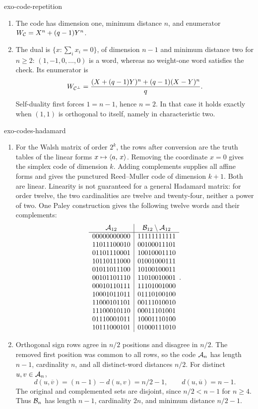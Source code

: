 \begin{correction}{exo-code-repetition}
\begin{enumerate}
\item The code has dimension one, minimum distance $n$, and enumerator
$W_{\mathcal{C}}=X^n+(q-1)Y^n$.
\item The dual is $\{x:\sum_i x_i=0\}$, of dimension $n-1$ and
minimum distance two for $n\geq2$: $(1,-1,0,\ldots,0)$ is a word,
whereas no weight-one word satisfies the check. Its enumerator is
\[
 W_{\mathcal{C}^\bot}=\frac{(X+(q-1)Y)^n+(q-1)(X-Y)^n}{q}.
\]
Self-duality first forces $1=n-1$, hence $n=2$. In that case it holds
exactly when $(1,1)$ is orthogonal to itself, namely in characteristic two.
\end{enumerate}
\end{correction}

\begin{correction}{exo-codes-hadamard}
\begin{enumerate}
\item For the Walsh matrix of order $2^k$, the rows after conversion
are the truth tables of the linear forms $x\mapsto\langle a,\,x\rangle$.
Removing the coordinate $x=0$ gives the simplex code of dimension $k$.
Adding complements supplies all affine forms and gives the punctured
Reed--Muller code of dimension $k+1$. Both are linear. Linearity is not
guaranteed for a general Hadamard matrix: for order twelve, the two
cardinalities are twelve and twenty-four, neither a power of two.
One Paley construction gives the following twelve words and their
complements:
\[
\begin{array}{c|c}
 \mathcal{A}_{12}&\mathcal{B}_{12}\setminus\mathcal{A}_{12}\\\hline
 00000000000&11111111111\\11011100010&00100011101\\
 01101110001&10010001110\\10110111000&01001000111\\
 01011011100&10100100011\\00101101110&11010010001\\
 00010110111&11101001000\\10001011011&01110100100\\
 11000101101&00111010010\\11100010110&00011101001\\
 01110001011&10001110100\\10111000101&01000111010
\end{array}.
\]
\item Orthogonal sign rows agree in $n/2$ positions and disagree in
$n/2$. The removed first position was common to all rows, so the code
$\mathcal{A}_n$ has length $n-1$, cardinality $n$, and all distinct-word distances
$n/2$. For distinct $u,v\in\mathcal{A}_n$,
\[
 d(u,\overline v)=(n-1)-d(u,v)=n/2-1,
 \qquad d(u,\overline u)=n-1.
\]
The original and complemented sets are disjoint, since $n/2<n-1$ for
$n\geq4$. Thus $\mathcal{B}_n$ has length $n-1$, cardinality $2n$, and minimum
distance $n/2-1$.
\end{enumerate}
\end{correction}

